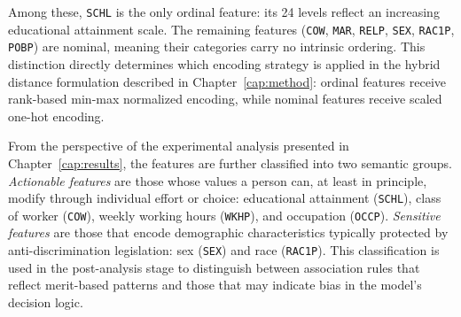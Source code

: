 Among these, \texttt{SCHL} is the only ordinal feature: its 24 levels reflect an increasing educational attainment scale. The remaining features (\texttt{COW}, \texttt{MAR}, \texttt{RELP}, \texttt{SEX}, \texttt{RAC1P}, \texttt{POBP}) are nominal, meaning their categories carry no intrinsic ordering. This distinction directly determines which encoding strategy is applied in the hybrid distance formulation described in Chapter~\ref{cap:method}: ordinal features receive rank-based min-max normalized encoding, while nominal features receive scaled one-hot encoding.

From the perspective of the experimental analysis presented in Chapter~\ref{cap:results}, the features are further classified into two semantic groups. \emph{Actionable features} are those whose values a person can, at least in principle, modify through individual effort or choice: educational attainment (\texttt{SCHL}), class of worker (\texttt{COW}), weekly working hours (\texttt{WKHP}), and occupation (\texttt{OCCP}). \emph{Sensitive features} are those that encode demographic characteristics typically protected by anti-discrimination legislation: sex (\texttt{SEX}) and race (\texttt{RAC1P}). This classification is used in the post-analysis stage to distinguish between association rules that reflect merit-based patterns and those that may indicate bias in the model's decision logic.